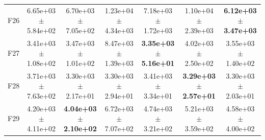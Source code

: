 \begin{table}
{\begin{tabular}{lcccccc}
F26 & 6.65e+03 $\pm$ 5.84e+02 & 6.70e+03 $\pm$ 7.05e+02 & 1.23e+04 $\pm$ 4.34e+03 & 7.18e+03 $\pm$ 1.72e+03 & 1.10e+04 $\pm$ 2.39e+03 & \textbf{6.12e+03 $\pm$ 3.47e+03} \\
F27 & 3.41e+03 $\pm$ 1.08e+02 & 3.47e+03 $\pm$ 1.01e+02 & 8.47e+03 $\pm$ 1.39e+03 & \textbf{3.35e+03 $\pm$ 5.16e+01} & 4.02e+03 $\pm$ 2.50e+02 & 3.55e+03 $\pm$ 1.40e+02 \\
F28 & 3.71e+03 $\pm$ 7.63e+02 & 3.30e+03 $\pm$ 2.17e+01 & 3.30e+03 $\pm$ 2.94e+01 & 3.41e+03 $\pm$ 3.34e+01 & \textbf{3.29e+03 $\pm$ 2.57e+01} & 3.30e+03 $\pm$ 2.03e+01 \\
F29 & 4.20e+03 $\pm$ 4.11e+02 & \textbf{4.04e+03 $\pm$ 2.10e+02} & 6.72e+03 $\pm$ 7.07e+02 & 4.74e+03 $\pm$ 3.21e+02 & 5.21e+03 $\pm$ 3.59e+02 & 4.58e+03 $\pm$ 4.00e+02 \\
\bottomrule
\end{tabular}%
}
\end{table}
